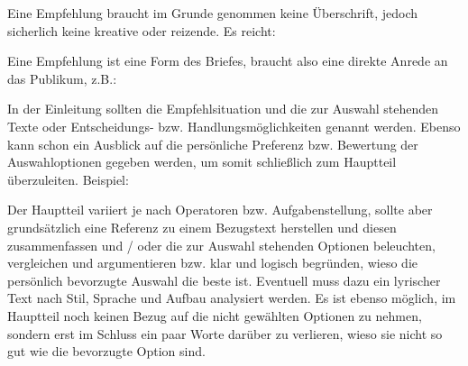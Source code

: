 \begin{itemize}


	Eine Empfehlung braucht im Grunde genommen keine \"{U}berschrift, jedoch sicherlich keine kreative oder reizende. Es reicht: 


	Eine Empfehlung ist eine Form des Briefes, braucht also eine direkte Anrede an das Publikum, z.B.: 


	In der Einleitung sollten die Empfehlsituation und die zur Auswahl stehenden Texte oder Entscheidungs- bzw. Handlungsm\"{o}glichkeiten genannt werden. Ebenso kann schon ein Ausblick auf die pers\"{o}nliche Preferenz bzw. Bewertung der Auswahloptionen gegeben werden, um somit schlie\ss{}lich zum Hauptteil \"{u}berzuleiten. Beispiel:



	Der Hauptteil variiert je nach Operatoren bzw. Aufgabenstellung, sollte aber grunds\"{a}tzlich eine Referenz zu einem Bezugstext herstellen und diesen zusammenfassen und / oder die zur Auswahl stehenden Optionen beleuchten, vergleichen und argumentieren bzw. klar und logisch begr\"{u}nden, wieso die pers\"{o}nlich bevorzugte Auswahl die beste ist. Eventuell muss dazu ein lyrischer Text nach Stil, Sprache und Aufbau analysiert werden. Es ist ebenso m\"{o}glich, im Hauptteil noch keinen Bezug auf die nicht gew\"{a}hlten Optionen zu nehmen, sondern erst im Schluss ein paar Worte dar\"{u}ber zu verlieren, wieso sie nicht so gut wie die bevorzugte Option sind.

\pagebreak



\end{itemize}
